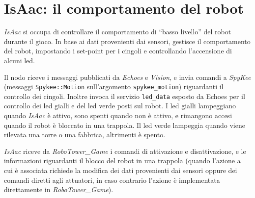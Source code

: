 \section{IsAac: il comportamento del robot}
\emph{IsAac} si occupa di controllare il comportamento di ``basso livello'' del robot durante il gioco. In base ai dati provenienti dai sensori, gestisce il comportamento del robot, impostando i set-point per i cingoli e controllando l'accensione di alcuni led.

Il nodo riceve i messaggi pubblicati da \emph{Echoes} e \emph{Vision}, e invia comandi a \emph{SpyKee} (messaggi \verb|Spykee::Motion| sull'argomento \verb|spykee_motion|) riguardanti il controllo dei cingoli. Inoltre invoca il servizio \verb|led_data| esposto da Echoes per il controllo dei led gialli e del led verde posti sul robot. I led gialli lampeggiano quando \emph{IsAac} è attivo, sono spenti quando non è attivo, e rimangono accesi quando il robot è bloccato in una trappola. Il led verde lampeggia quando viene rilevata una torre o una fabbrica, altrimenti è spento.

\emph{IsAac} riceve da \emph{RoboTower\_Game} i comandi di attivazione e disattivazione, e le informazioni riguardanti il blocco del robot in una trappola (quando l'azione a cui è associata richiede la modifica dei dati provenienti dai sensori oppure dei comandi diretti agli attuatori, in caso contrario l'azione è implementata direttamente in \emph{RoboTower\_Game}).

